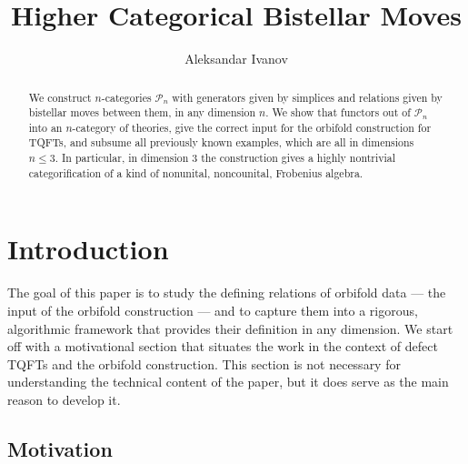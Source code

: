 \documentclass[12pt,a4paper]{article}
\numberwithin{equation}{section}
\begin{document}
\title{\sc Higher Categorical Bistellar Moves}


\author{Aleksandar Ivanov}
\date{}
\maketitle

\begin{abstract}
    We construct $n$-categories $\mathscr{P}_n$ with generators given by simplices and relations given by bistellar moves between them, in any dimension $n$. We show that functors out of $\mathscr{P}_n$ into an $n$-category of theories, give the correct input for the orbifold construction for TQFTs, and subsume all previously known examples, which are all in dimensions $n \leq 3$. In particular, in dimension 3 the construction gives a highly nontrivial categorification of a kind of nonunital, noncounital, Frobenius algebra.
\end{abstract}

\tableofcontents


\section{Introduction}

The goal of this paper is to study the defining relations of orbifold data --- the input of the orbifold construction --- and to capture them into a rigorous, algorithmic framework that provides their definition in any dimension. We start off with a motivational section that situates the work in the context of defect TQFTs and the orbifold construction. This section is not necessary for understanding the technical content of the paper, but it does serve as the main reason to develop it.

\setcounter{subsection}{-1}
\subsection{Motivation}
\end{document}
